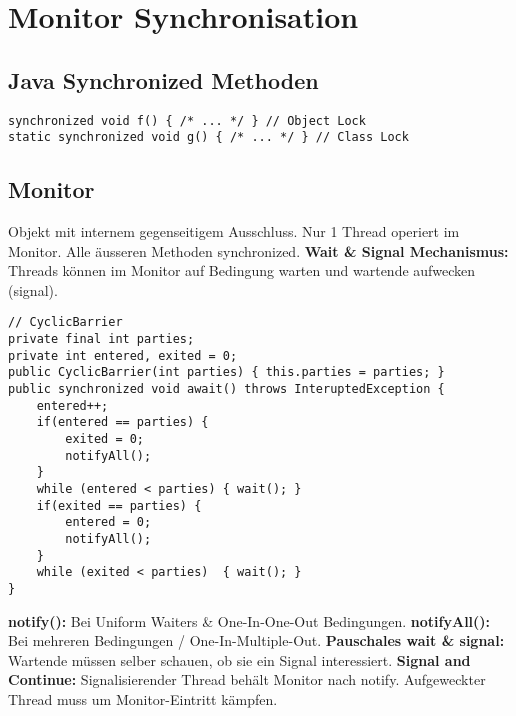 
\section{Monitor Synchronisation}
\subsection{Java Synchronized Methoden}
\begin{lstlisting}
synchronized void f() { /* ... */ } // Object Lock
static synchronized void g() { /* ... */ } // Class Lock
\end{lstlisting}

\subsection{Monitor}
Objekt mit internem gegenseitigem Ausschluss. Nur 1 Thread operiert im Monitor. Alle äusseren Methoden synchronized.
\textbf{Wait \& Signal Mechanismus:} Threads können im Monitor auf Bedingung warten und wartende aufwecken (signal).

\begin{lstlisting}
// CyclicBarrier
private final int parties;
private int entered, exited = 0;
public CyclicBarrier(int parties) { this.parties = parties; }
public synchronized void await() throws InteruptedException {
    entered++;
    if(entered == parties) {
        exited = 0;
        notifyAll();
    }
    while (entered < parties) { wait(); }
    if(exited == parties) {
        entered = 0;
        notifyAll();
    }
    while (exited < parties)  { wait(); }
}
\end{lstlisting}
\textbf{notify():} Bei Uniform Waiters \& One-In-One-Out Bedingungen.
\textbf{notifyAll():} Bei mehreren Bedingungen / One-In-Multiple-Out. 
\textbf{Pauschales wait \& signal:} Wartende müssen selber schauen, ob sie ein Signal interessiert.
\textbf{Signal and Continue:} Signalisierender Thread behält Monitor nach notify. Aufgeweckter Thread muss um Monitor-Eintritt kämpfen.